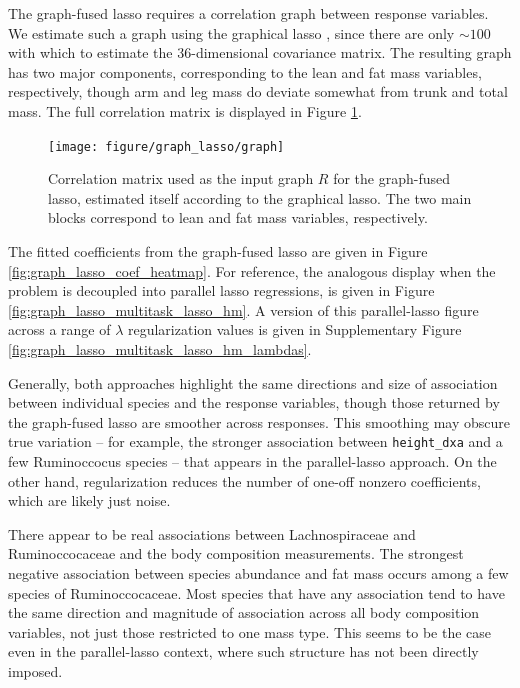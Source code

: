 \documentclass[14pt]{extarticle}
\begin{document}
The graph-fused lasso requires a correlation graph between response variables.
We estimate such a graph using the graphical lasso \citep{friedman2008sparse},
since there are only $\sim 100$ with which to estimate the 36-dimensional
covariance matrix. The resulting graph has two major components, corresponding
to the lean and fat mass variables, respectively, though arm and leg mass do
deviate somewhat from trunk and total mass. The full correlation matrix is
displayed in Figure \ref{fig:graph_lasso_graph}.

\begin{figure}
  \centering
  \texttt{[image: figure/graph\_lasso/graph]}
  \caption{Correlation matrix used as the input graph $R$ for the graph-fused
    lasso, estimated itself according to the graphical
    lasso. The two main blocks correspond to lean and fat mass variables,
    respectively. \label{fig:graph_lasso_graph} }
\end{figure}

The fitted coefficients from the graph-fused lasso are given in Figure
\ref{fig:graph_lasso_coef_heatmap}. For reference, the analogous display when
the problem is decoupled into parallel lasso regressions, is given in Figure
\ref{fig:graph_lasso_multitask_lasso_hm}. A version of this parallel-lasso
figure across a range of $\lambda$ regularization values is given in
Supplementary Figure \ref{fig:graph_lasso_multitask_lasso_hm_lambdas}.

Generally, both approaches highlight the same directions and size of association
between individual species and the response variables, though those returned by
the graph-fused lasso are smoother across responses. This smoothing may obscure
true variation -- for example, the stronger association between
\texttt{height\_dxa} and a few Ruminoccocus species -- that appears in the
parallel-lasso approach. On the other hand, regularization reduces the number of
one-off nonzero coefficients, which are likely just noise.

There appear to be real associations between Lachnospiraceae and Ruminoccocaceae
and the body composition measurements. The strongest negative association
between species abundance and fat mass occurs among a few species of
Ruminoccocaceae. Most species that have any association tend to have the same
direction and magnitude of association across all body composition variables,
not just those restricted to one mass type. This seems to be the case even in
the parallel-lasso context, where such structure has not been directly imposed.
\end{document}
